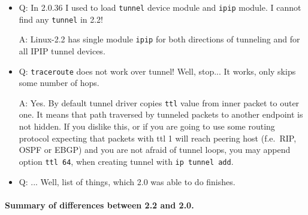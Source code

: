 \begin{itemize}
\item
Q: In 2.0.36 I used to load \verb|tunnel| device module and \verb|ipip| module.
I cannot find any \verb|tunnel| in 2.2!

A: Linux-2.2 has single module \verb|ipip| for both directions of tunneling
and for all IPIP tunnel devices.

\item
Q: \verb|traceroute| does not work over tunnel! Well, stop... It works,
     only skips some number of hops.

A: Yes. By default tunnel driver copies \verb|ttl| value from
inner packet to outer one. It means that path traversed by tunneled
packets to another endpoint is not hidden. If you dislike this, or if you
are going to use some routing protocol expecting that packets
with ttl 1 will reach peering host (f.e.\ RIP, OSPF or EBGP)
and you are not afraid of
tunnel loops, you may append option \verb|ttl 64|, when creating tunnel
with \verb|ip tunnel add|.

\item
Q: ... Well, list of things, which 2.0 was able to do finishes.

\end{itemize}

\paragraph{Summary of differences between 2.2 and 2.0.}

